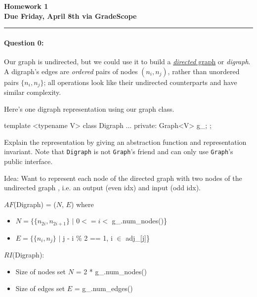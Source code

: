 \documentclass[12pt,letterpaper,twoside]{article}
\begin{document}
{\centering \textbf{Homework 1\\ Due Friday, April 8th via GradeScope\\}}
\vspace*{-8pt}\noindent\rule{\linewidth}{1pt}

\paragraph{Question 0: } Our graph is undirected, but we could use it to build a
\href{https://en.wikipedia.org/wiki/Directed_graph#Definition}{\emph{directed} graph} or \emph{digraph}. 
A digraph's edges are \emph{ordered} pairs of nodes $(n_i, n_j)$, rather than unordered pairs $\{n_i, n_j\}$; 
all operations look like their undirected counterparts and have similar complexity.

Here's one digraph representation using our graph class.
\begin{cpp}
template <typename V> 
class Digraph { 
... 
private:
Graph<V> g_;
};
\end{cpp}
Explain the representation by giving an abstraction function and
representation invariant. Note that \texttt{Digraph} is not
\texttt{Graph}'s friend and can only use \texttt{Graph}'s public
interface. \\

{\color{purple}Idea: Want to represent each node of the directed graph with two nodes of 
the undirected graph , i.e. an output (even idx) and input (odd idx).

$AF$(Digraph) = ($N$, $E$) where
\begin{itemize}
    \item $N = \{\{n_{2i}, n_{2i+1}\}$ $|$ $0 <= i <$ g\_.num\_nodes()\}
    \item $E = \{\{n_{i}, n_{j}\}$ $|$ j - i $\%$ 2 == 1, i $\in$ adj\_[j]\}
\end{itemize}

$RI$(Digraph): 
\begin{itemize}
    \item Size of nodes set $N$ = 2 * g\_.num\_nodes()
    \item Size of edges set $E$ = g\_.num\_edges()
\end{itemize}

}
\end{document}
